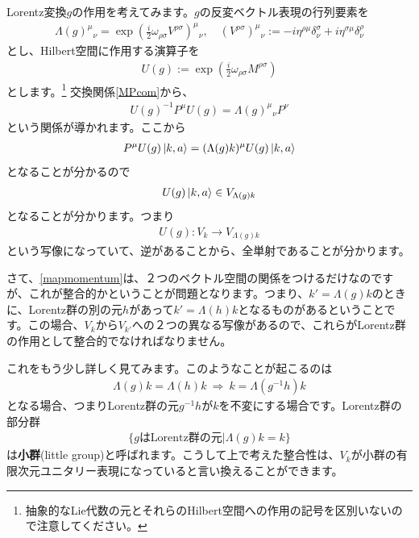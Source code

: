 \documentclass[report,paper=a4, fontsize=12pt, line_length=16cm, number_of_lines=34,dvipdfmx]{jlreq}
\numberwithin{equation}{chapter}
\numberwithin{equation}{section}
\newcommand{\kyou}[1]{{\sffamily \bfseries #1}}
\begin{document}
Lorentz変換$g$の作用を考えてみます。$g$の反変ベクトル表現の行列要素を
\begin{align}
  \Lambda(g)^{\mu}{}_{\nu}= \exp(\frac{i}{2}\omega_{\rho\sigma}V^{\rho\sigma})^{\mu}{}_{\nu},\quad
  (V^{\rho\sigma})^{\mu}{}_{\nu}:=-i\eta^{\rho\mu}\delta^{\sigma}_{\nu}+i\eta^{\sigma\mu}\delta^{\rho}_{\nu}
  \label{vectorrep}
\end{align}
とし、Hilbert空間に作用する演算子を
\begin{align}
  U(g):=\exp(\frac{i}{2}\omega_{\rho\sigma}M^{\rho\sigma})
\end{align}
とします。\footnote{抽象的なLie代数の元とそれらのHilbert空間への作用の記号を区別いないので注意してください。}
交換関係\eqref{MPcom}から、
\begin{align}
  U(g)^{-1}P^{\mu}U(g)=\Lambda(g)^{\mu}{}_{\nu}P^{\nu}
\end{align}
という関係が導かれます。ここから
\begin{align}
  P^{\mu}U(g)\ket{k,a}=(\Lambda(g)k)^{\mu}U(g)\ket{k,a}
\end{align}
となることが分かるので
\begin{align}
  U(g)\ket{k,a} \in V_{\Lambda(g)k}
\end{align}
となることが分かります。つまり
\begin{align}
  U(g):V_{k} \to V_{\Lambda(g)k}\label{mapmomentum}
\end{align}
という写像になっていて、逆があることから、全単射であることが分かります。

さて、\eqref{mapmomentum}は、２つのベクトル空間の関係をつけるだけなのですが、これが整合的かということが問題となります。つまり、$k'=\Lambda(g)k$のときに、Lorentz群の別の元$h$があって$k'=\Lambda(h)k$となるものがあるということです。この場合、$V_{k}$から$V_{k'}$への２つの異なる写像があるので、これらがLorentz群の作用として整合的でなければなりません。

これをもう少し詳しく見てみます。このようなことが起こるのは
\begin{align}
  \Lambda(g)k=\Lambda(h)k \ \Rightarrow\ k=\Lambda(g^{-1}h)k
\end{align}
となる場合、つまりLorentz群の元$g^{-1}h$が$k$を不変にする場合です。Lorentz群の部分群
\begin{align}
  \{g\text{はLorentz群の元}| \Lambda(g)k=k \}
\end{align}
は\kyou{小群}(little group)と呼ばれます。こうして上で考えた整合性は、$V_k$が小群の有限次元ユニタリー表現になっていると言い換えることができます。
\end{document}
